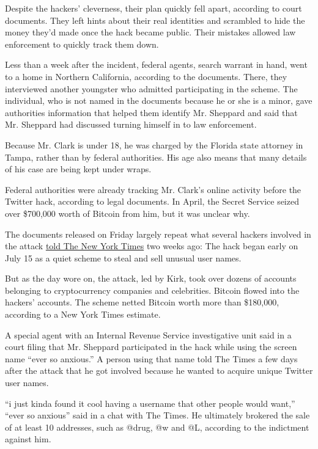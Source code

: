 Despite the hackers' cleverness, their plan quickly fell apart,
according to court documents. They left hints about their real
identities and scrambled to hide the money they'd made once the hack
became public. Their mistakes allowed law enforcement to quickly track
them down.

Less than a week after the incident, federal agents, search warrant in
hand, went to a home in Northern California, according to the documents.
There, they interviewed another youngster who admitted participating in
the scheme. The individual, who is not named in the documents because he
or she is a minor, gave authorities information that helped them
identify Mr. Sheppard and said that Mr. Sheppard had discussed turning
himself in to law enforcement.

Because Mr. Clark is under 18, he was charged by the Florida state
attorney in Tampa, rather than by federal authorities. His age also
means that many details of his case are being kept under wraps.

Federal authorities were already tracking Mr. Clark's online activity
before the Twitter hack, according to legal documents. In April, the
Secret Service seized over \$700,000 worth of Bitcoin from him, but it
was unclear why.

The documents released on Friday largely repeat what several hackers
involved in the attack
\href{https://www.nytimes3xbfgragh.onion/2020/07/17/technology/twitter-hackers-interview.html}{told
The New York Times} two weeks ago: The hack began early on July 15 as a
quiet scheme to steal and sell unusual user names.

But as the day wore on, the attack, led by Kirk, took over dozens of
accounts belonging to cryptocurrency companies and celebrities. Bitcoin
flowed into the hackers' accounts. The scheme netted Bitcoin worth more
than \$180,000, according to a New York Times estimate.

A special agent with an Internal Revenue Service investigative unit said
in a court filing that Mr. Sheppard participated in the hack while using
the screen name ``ever so anxious.'' A person using that name told The
Times a few days after the attack that he got involved because he wanted
to acquire unique Twitter user names.

``i just kinda found it cool having a username that other people would
want,'' ``ever so anxious'' said in a chat with The Times. He ultimately
brokered the sale of at least 10 addresses, such as @drug, @w and @L,
according to the indictment against him.

